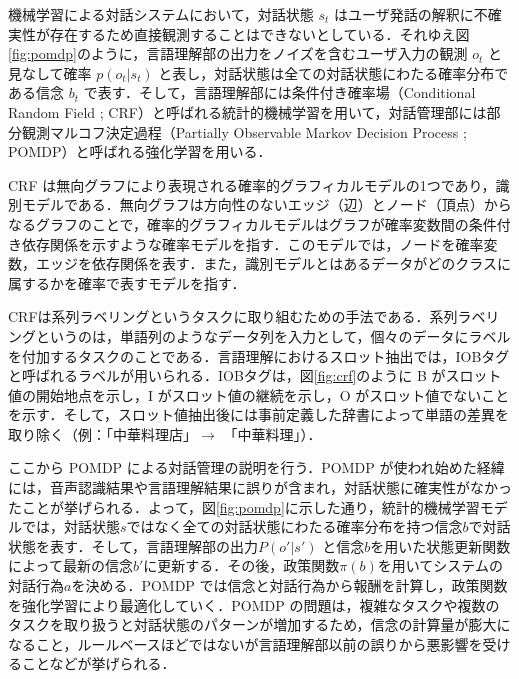 機械学習による対話システムにおいて，対話状態 $s_t$ はユーザ発話の解釈に不確実性が存在するため直接観測することはできないとしている．それゆえ図\ref{fig:pomdp}のように，言語理解部の出力をノイズを含むユーザ入力の観測 $o_t$ と見なして確率 $p(o_t|s_t)$ と表し，対話状態は全ての対話状態にわたる確率分布である信念 $b_t$ で表す．そして，言語理解部には条件付き確率場（Conditional
Random Field ; CRF）\cite{crf}と呼ばれる統計的機械学習を用いて，対話管理部には部分観測マルコフ決定過程（Partially Observable Markov Decision Process ; POMDP）\cite{pomdp}と呼ばれる強化学習を用いる．
\par
CRF は無向グラフにより表現される確率的グラフィカルモデルの1つであり，識別モデルである．無向グラフは方向性のないエッジ（辺）とノード（頂点）からなるグラフのことで，確率的グラフィカルモデルはグラフが確率変数間の条件付き依存関係を示すような確率モデルを指す．このモデルでは，ノードを確率変数，エッジを依存関係を表す．また，識別モデルとはあるデータがどのクラスに属するかを確率で表すモデルを指す．
\par
CRFは系列ラベリングというタスクに取り組むための手法である．系列ラベリングというのは，単語列のようなデータ列を入力として，個々のデータにラベルを付加するタスクのことである．言語理解におけるスロット抽出では，IOBタグと呼ばれるラベルが用いられる．IOBタグは，図\ref{fig:crf}のように B がスロット値の開始地点を示し，I がスロット値の継続を示し，O がスロット値でないことを示す．そして，スロット値抽出後には事前定義した辞書によって単語の差異を取り除く（例：「中華料理店」$\rightarrow$ 「中華料理」）．
\par
ここから POMDP による対話管理の説明を行う．POMDP が使われ始めた経緯には，音声認識結果や言語理解結果に誤りが含まれ，対話状態に確実性がなかったことが挙げられる．よって，図\ref{fig:pomdp}に示した通り，統計的機械学習モデルでは，対話状態$s$ではなく全ての対話状態にわたる確率分布を持つ信念$b$で対話状態を表す．そして，言語理解部の出力$P(o'|s')$ と信念$b$を用いた状態更新関数によって最新の信念$b'$に更新する．その後，政策関数$\pi (b)$を用いてシステムの対話行為$a$を決める．POMDP では信念と対話行為から報酬を計算し，政策関数を強化学習により最適化していく．POMDP の問題は，複雑なタスクや複数のタスクを取り扱うと対話状態のパターンが増加するため，信念の計算量が膨大になること，ルールベースほどではないが言語理解部以前の誤りから悪影響を受けることなどが挙げられる．